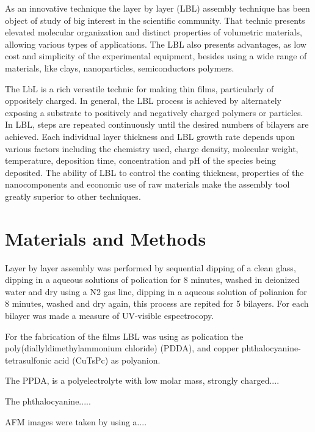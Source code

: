 \documentclass[%
 reprint,
 amsmath,amssymb,
 aps,
]{revtex4-1}
\begin{document}
As an innovative technique the layer by layer (LBL) assembly technique has been object of study of big interest in the scientific community. That technic presents elevated molecular organization and distinct properties of volumetric materials, allowing various types of applications. The LBL also presents advantages, as low cost and simplicity of the experimental equipment, besides using a wide range of materials, like clays, nanoparticles, semiconductors polymers.

The LbL is a rich versatile technic for making thin films, particularly of oppositely charged. In general, the LBL process is achieved by alternately exposing a substrate to positively and negatively charged polymers or particles. In LBL, steps are repeated continuously until the desired numbers of bilayers are achieved. Each individual layer thickness and LBL growth rate depends upon various factors including the chemistry used, charge density, molecular weight, temperature, deposition time, concentration and pH of the species being deposited. The ability of LBL to control the coating thickness, properties of the nanocomponents and economic use of raw materials make the assembly tool greatly superior to other techniques\cite{halthur}.

\section{\label{sec:level2}Materials and Methods}

Layer by layer assembly was performed by sequential dipping of a clean glass, dipping in  a aqueous solutions of polication for 8 minutes, washed in deionized water and dry using a N2 gas line, dipping in a aqueous solution of polianion for 8 minutes, washed and dry again, this process are repited for 5 bilayers. For each bilayer was made a measure of UV-visible espectrocopy.

For the fabrication of the films LBL was using as polication the poly(diallyldimethylammonium chloride) (PDDA), and  copper phthalocyanine-tetrasulfonic acid (CuTsPc) as polyanion.

The PPDA, is a polyelectrolyte with low molar mass, strongly charged....

The phthalocyanine.....

AFM images were taken by using a....
\end{document}
